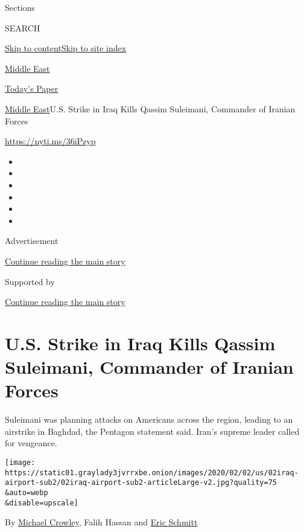 Sections

SEARCH

\protect\hyperlink{site-content}{Skip to
content}\protect\hyperlink{site-index}{Skip to site index}

\href{https://www.nytimes3xbfgragh.onion/section/world/middleeast}{Middle
East}

\href{https://myaccount.nytimes3xbfgragh.onion/auth/login?response_type=cookie\&client_id=vi}{}

\href{https://www.nytimes3xbfgragh.onion/section/todayspaper}{Today's
Paper}

\href{/section/world/middleeast}{Middle East}\textbar{}U.S. Strike in
Iraq Kills Qassim Suleimani, Commander of Iranian Forces

\url{https://nyti.ms/36iPzyp}

\begin{itemize}
\item
\item
\item
\item
\item
\item
\end{itemize}

Advertisement

\protect\hyperlink{after-top}{Continue reading the main story}

Supported by

\protect\hyperlink{after-sponsor}{Continue reading the main story}

\hypertarget{us-strike-in-iraq-kills-qassim-suleimani-commander-of-iranian-forces}{%
\section{U.S. Strike in Iraq Kills Qassim Suleimani, Commander of
Iranian
Forces}\label{us-strike-in-iraq-kills-qassim-suleimani-commander-of-iranian-forces}}

Suleimani was planning attacks on Americans across the region, leading
to an airstrike in Baghdad, the Pentagon statement said. Iran's supreme
leader called for vengeance.

\texttt{[image: https://static01.graylady3jvrrxbe.onion/images/2020/02/02/us/02iraq-airport-sub2/02iraq-airport-sub2-articleLarge-v2.jpg?quality=75\\\&auto=webp\\\&disable=upscale]}

By \href{https://www.nytimes3xbfgragh.onion/by/michael-crowley}{Michael
Crowley}, Falih Hassan and
\href{https://www.nytimes3xbfgragh.onion/by/eric-schmitt}{Eric Schmitt}


